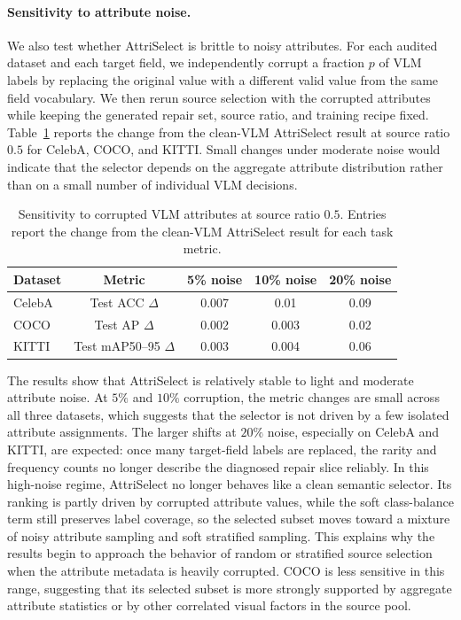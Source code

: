 \documentclass{article}
\newcommand{\model}{AttriSelect\xspace}
\begin{document}
\paragraph{Sensitivity to attribute noise.}
We also test whether \model is brittle to noisy attributes. For each audited dataset and each target field, we independently corrupt a fraction $p$ of VLM labels by replacing the original value with a different valid value from the same field vocabulary. We then rerun source selection with the corrupted attributes while keeping the generated repair set, source ratio, and training recipe fixed. Table~\ref{tab:attribute-noise-sensitivity} reports the change from the clean-VLM \model result at source ratio $0.5$ for CelebA, COCO, and KITTI. Small changes under moderate noise would indicate that the selector depends on the aggregate attribute distribution rather than on a small number of individual VLM decisions.

\begin{table}[h]
\centering
\caption{Sensitivity to corrupted VLM attributes at source ratio $0.5$. Entries report the change from the clean-VLM \model result for each task metric.}
\label{tab:attribute-noise-sensitivity}
\small
\setlength{\tabcolsep}{5pt}
\begin{tabular}{l c c c c}
\toprule
Dataset & Metric & 5\% noise & 10\% noise & 20\% noise \\
\midrule
CelebA & Test ACC $\Delta$ & 0.007 & 0.01 & 0.09 \\
COCO & Test AP $\Delta$ & 0.002 & 0.003 & 0.02 \\
KITTI & Test mAP50--95 $\Delta$ & 0.003 & 0.004 & 0.06 \\
\bottomrule
\end{tabular}
\end{table}

The results show that \model is relatively stable to light and moderate attribute noise. At $5\%$ and $10\%$ corruption, the metric changes are small across all three datasets, which suggests that the selector is not driven by a few isolated attribute assignments. The larger shifts at $20\%$ noise, especially on CelebA and KITTI, are expected: once many target-field labels are replaced, the rarity and frequency counts no longer describe the diagnosed repair slice reliably. In this high-noise regime, \model no longer behaves like a clean semantic selector. Its ranking is partly driven by corrupted attribute values, while the soft class-balance term still preserves label coverage, so the selected subset moves toward a mixture of noisy attribute sampling and soft stratified sampling. This explains why the results begin to approach the behavior of random or stratified source selection when the attribute metadata is heavily corrupted. COCO is less sensitive in this range, suggesting that its selected subset is more strongly supported by aggregate attribute statistics or by other correlated visual factors in the source pool.
\end{document}
